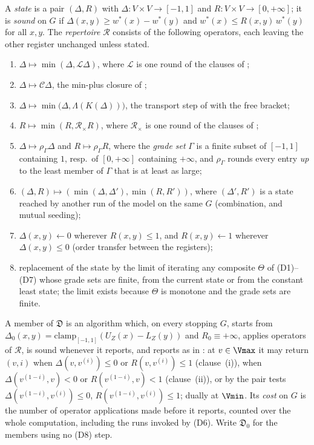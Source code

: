 \begin{definition}\label{ob:model}
A \emph{state} is a pair $(\Delta,R)$ with
$\Delta\colon V\times V\to[-1,1]$ and $R\colon V\times V\to[0,+\infty]$;
it is \emph{sound} on $G$ if $\Delta(x,y)\ge w^\ast(x)-w^\ast(y)$ and
$w^\ast(x)\le R(x,y)\,w^\ast(y)$ for all $x,y$. The \emph{repertoire}
$\mathcal R$ consists of the following operators, each leaving the other
register unchanged unless stated.
\begin{enumerate}[label=\textup{(D\arabic*)},leftmargin=3.4em]
\item $\Delta\mapsto\min(\Delta,\mathcal L\Delta)$, where $\mathcal L$ is
  one round of the clauses of ;
\item $\Delta\mapsto\mathcal C\Delta$, the min-plus closure of
  ;
\item $\Delta\mapsto\min\bigl(\Delta,\Lambda(K(\Delta))\bigr)$, the
  transport step of  with the free bracket;
\item $R\mapsto\min(R,\mathcal R_{\times}R)$, where $\mathcal R_{\times}$
  is one round of the clauses of ;
\item $\Delta\mapsto\rho_{\Gamma}\Delta$ and $R\mapsto\rho_{\Gamma}R$,
  where the \emph{grade set} $\Gamma$ is a finite subset of $[-1,1]$
  containing $1$, resp.\ of $[0,+\infty]$ containing $+\infty$, and
  $\rho_\Gamma$ rounds every entry \emph{up} to the least member of
  $\Gamma$ that is at least as large;
\item $(\Delta,R)\mapsto(\min(\Delta,\Delta'),\min(R,R'))$, where
  $(\Delta',R')$ is a state reached by another run of the model on the
  same $G$ (combination, and mutual seeding);
\item $\Delta(x,y)\leftarrow0$ wherever $R(x,y)\le1$, and
  $R(x,y)\leftarrow1$ wherever $\Delta(x,y)\le0$ (order transfer between
  the registers);
\item replacement of the state by the limit of iterating any composite
  $\Theta$ of \textup{(D1)}--\textup{(D7)} whose grade sets are finite,
  from the current state or from the constant least state; the limit
  exists because $\Theta$ is monotone and the grade sets are finite.
\end{enumerate}
A member of $\mathfrak D$ is an algorithm which, on every stopping $G$,
starts from
$\Delta_0(x,y)=\mathrm{clamp}_{[-1,1]}(U_Z(x)-L_Z(y))$ and
$R_0\equiv+\infty$, applies operators of $\mathcal R$, is sound whenever
it reports, and reports as in : at $v\in\Vmax$ it
may return $(v,i)$ when $\Delta(v,v^{(i)})\le0$ or $R(v,v^{(i)})\le1$
(clause~(i)), when $\Delta(v^{(1-i)},v)<0$ or $R(v^{(1-i)},v)<1$
(clause~(ii)), or by the pair tests $\Delta(v^{(1-i)},v^{(i)})\le0$,
$R(v^{(1-i)},v^{(i)})\le1$; dually at $\Vmin$. Its \emph{cost} on $G$ is
the number of operator applications made before it reports, counted over
the whole computation, including the runs invoked by \textup{(D6)}. Write
$\mathfrak D_0$ for the members using no \textup{(D8)} step.
\end{definition}

